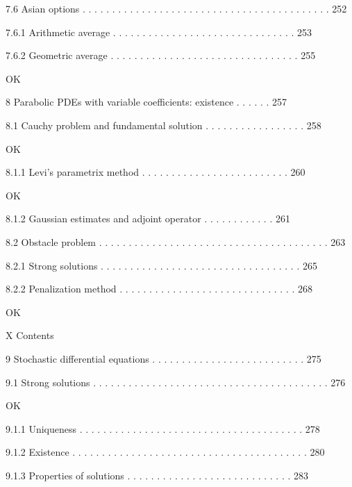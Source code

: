 7.6 Asian options . . . . . . . . . . . . . . . . . . . . . . . . . . . . . . . . . . . . . . . . . . 252



7.6.1 Arithmetic average . . . . . . . . . . . . . . . . . . . . . . . . . . . . . . . 253



7.6.2 Geometric average . . . . . . . . . . . . . . . . . . . . . . . . . . . . . . . . 255

OK

8 Parabolic PDEs with variable coefficients: existence . . . . . . 257



8.1 Cauchy problem and fundamental solution . . . . . . . . . . . . . . . . . 258

OK

8.1.1 Levi's parametrix method . . . . . . . . . . . . . . . . . . . . . . . . . 260

OK

8.1.2 Gaussian estimates and adjoint operator . . . . . . . . . . . . 261



8.2 Obstacle problem . . . . . . . . . . . . . . . . . . . . . . . . . . . . . . . . . . . . . . . 263



8.2.1 Strong solutions . . . . . . . . . . . . . . . . . . . . . . . . . . . . . . . . . . 265



8.2.2 Penalization method . . . . . . . . . . . . . . . . . . . . . . . . . . . . . . 268

OK

X Contents



9 Stochastic differential equations . . . . . . . . . . . . . . . . . . . . . . . . . . 275



9.1 Strong solutions . . . . . . . . . . . . . . . . . . . . . . . . . . . . . . . . . . . . . . . . 276

OK

9.1.1 Uniqueness . . . . . . . . . . . . . . . . . . . . . . . . . . . . . . . . . . . . . . 278



9.1.2 Existence . . . . . . . . . . . . . . . . . . . . . . . . . . . . . . . . . . . . . . . . 280



9.1.3 Properties of solutions . . . . . . . . . . . . . . . . . . . . . . . . . . . . 283



